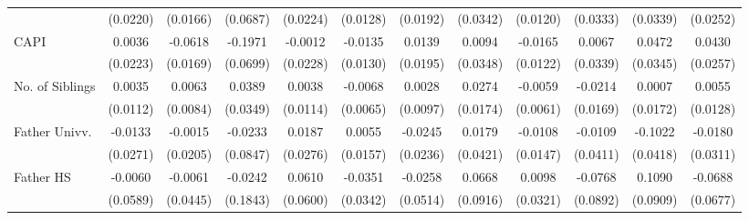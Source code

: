 \begin{table}[htbp]
\begin{tabular}{l*{11}{c}}
            &    (0.0220)         &    (0.0166)         &    (0.0687)         &    (0.0224)         &    (0.0128)         &    (0.0192)         &    (0.0342)         &    (0.0120)         &    (0.0333)         &    (0.0339)         &    (0.0252)         \\
\addlinespace
CAPI        &      0.0036         &     -0.0618\sym{***}&     -0.1971\sym{**} &     -0.0012         &     -0.0135         &      0.0139         &      0.0094         &     -0.0165         &      0.0067         &      0.0472         &      0.0430         \\
            &    (0.0223)         &    (0.0169)         &    (0.0699)         &    (0.0228)         &    (0.0130)         &    (0.0195)         &    (0.0348)         &    (0.0122)         &    (0.0339)         &    (0.0345)         &    (0.0257)         \\
\addlinespace
No. of Siblings&      0.0035         &      0.0063         &      0.0389         &      0.0038         &     -0.0068         &      0.0028         &      0.0274         &     -0.0059         &     -0.0214         &      0.0007         &      0.0055         \\
            &    (0.0112)         &    (0.0084)         &    (0.0349)         &    (0.0114)         &    (0.0065)         &    (0.0097)         &    (0.0174)         &    (0.0061)         &    (0.0169)         &    (0.0172)         &    (0.0128)         \\
\addlinespace
Father Univv.&     -0.0133         &     -0.0015         &     -0.0233         &      0.0187         &      0.0055         &     -0.0245         &      0.0179         &     -0.0108         &     -0.0109         &     -0.1022\sym{*}  &     -0.0180         \\
            &    (0.0271)         &    (0.0205)         &    (0.0847)         &    (0.0276)         &    (0.0157)         &    (0.0236)         &    (0.0421)         &    (0.0147)         &    (0.0411)         &    (0.0418)         &    (0.0311)         \\
\addlinespace
Father HS   &     -0.0060         &     -0.0061         &     -0.0242         &      0.0610         &     -0.0351         &     -0.0258         &      0.0668         &      0.0098         &     -0.0768         &      0.1090         &     -0.0688         \\
            &    (0.0589)         &    (0.0445)         &    (0.1843)         &    (0.0600)         &    (0.0342)         &    (0.0514)         &    (0.0916)         &    (0.0321)         &    (0.0892)         &    (0.0909)         &    (0.0677)         \\

\end{tabular}
\end{table}
